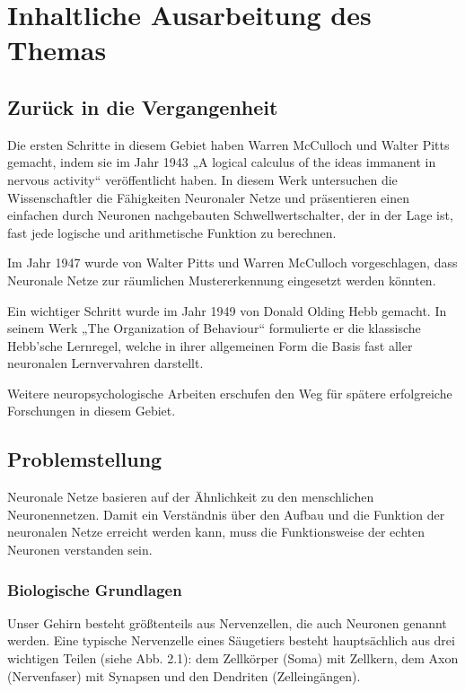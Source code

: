 \section{Inhaltliche Ausarbeitung des Themas}

\subsection{Zurück in die Vergangenheit}

 Die ersten Schritte in diesem Gebiet haben Warren McCulloch und Walter Pitts gemacht, indem sie im Jahr 1943 „A logical calculus of the ideas immanent in nervous activity“ veröffentlicht haben. In diesem Werk  untersuchen die Wissenschaftler die Fähigkeiten Neuronaler Netze und präsentieren einen einfachen durch Neuronen nachgebauten Schwellwertschalter, der in der Lage ist, fast jede logische und arithmetische Funktion zu berechnen.

Im Jahr 1947 wurde von Walter Pitts und Warren McCulloch vorgeschlagen, dass Neuronale Netze zur räumlichen Mustererkennung eingesetzt werden könnten.

Ein wichtiger Schritt wurde im Jahr 1949 von Donald Olding Hebb gemacht. In seinem Werk „The Organization of Behaviour“ formulierte er die klassische Hebb'sche Lernregel, welche in ihrer allgemeinen Form die Basis fast aller neuronalen Lernvervahren darstellt.

Weitere neuropsychologische Arbeiten erschufen den Weg für spätere erfolgreiche Forschungen in diesem Gebiet.

\subsection{Problemstellung}

Neuronale Netze basieren auf der Ähnlichkeit zu den menschlichen Neuronennetzen. Damit ein Verständnis über den Aufbau und die Funktion der neuronalen Netze erreicht werden kann, muss die Funktionsweise der echten Neuronen verstanden sein.

\subsubsection{Biologische Grundlagen}

Unser Gehirn besteht größtenteils aus Nervenzellen, die auch Neuronen genannt werden. Eine typische Nervenzelle eines Säugetiers besteht hauptsächlich aus drei wichtigen Teilen (siehe Abb. 2.1): dem Zellkörper (Soma) mit Zellkern, dem Axon (Nervenfaser) mit Synapsen und den Dendriten (Zelleingängen).


